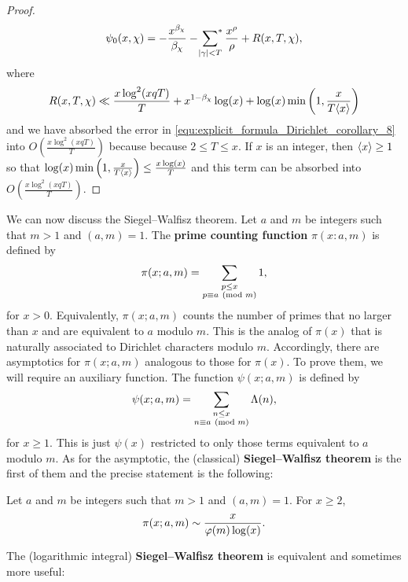 \begin{proof}
      \begin{equation}\label{equ:explicit_formula_Dirichlet_corollary_10}
        \psi_{0}(x,\chi) = -\frac{x^{\beta_{\chi}}}{\beta_{\chi}}-\sideset{}{^{\ast}}\sum_{|\gamma| < T}\frac{x^{\rho}}{\rho}+R(x,T,\chi),
      \end{equation}
      where
      \[
        R(x,T,\chi) \ll \frac{x\log^{2}(xqT)}{T}+x^{1-\beta_{\chi}}\log(x)+\log(x)\min\left(1,\frac{x}{T\langle x\rangle}\right)
      \]
      and we have absorbed the error in \cref{equ:explicit_formula_Dirichlet_corollary_8} into $O\left(\frac{x\log^{2}(xqT)}{T}\right)$ because because $2 \le T \le x$. If $x$ is an integer, then $\langle x\rangle \ge 1$ so that $\log(x)\min\left(1,\frac{x}{T\langle x\rangle}\right) \le \frac{x\log(x)}{T}$ and this term can be absorbed into $O\left(\frac{x\log^{2}(xqT)}{T}\right)$.
    \end{proof}
    
    We can now discuss the Siegel–Walfisz theorem. Let $a$ and $m$ be integers such that $m > 1$ and $(a,m) = 1$. The \textbf{prime counting function} $\pi(x:a,m)$ is defined by
    \[
      \pi(x;a,m) = \sum_{\substack{p \le x \\ p \equiv a \ \left(\text{mod }m\right)}}1,
    \]
    for $x > 0$. Equivalently, $\pi(x;a,m)$ counts the number of primes that no larger than $x$ and are equivalent to $a$ modulo $m$. This is the analog of $\pi(x)$ that is naturally associated to Dirichlet characters modulo $m$. Accordingly, there are asymptotics for $\pi(x;a,m)$ analogous to those for $\pi(x)$. To prove them, we will require an auxiliary function. The function $\psi(x;a,m)$ is defined by
    \[
      \psi(x;a,m) = \sum_{\substack{n \le x \\ n \equiv a \ \left(\text{mod }m\right)}}\Lambda(n),
    \]
    for $x \ge 1$. This is just $\psi(x)$ restricted to only those terms equivalent to $a$ modulo $m$. As for the asymptotic, the (classical) \textbf{Siegel–Walfisz theorem} is the first of them and the precise statement is the following:

    \begin{theorem}
      Let $a$ and $m$ be integers such that $m > 1$ and $(a,m) = 1$. For $x \ge 2$,
      \[
        \pi(x;a,m) \sim \frac{x}{\varphi(m)\log(x)}.
      \]
    \end{theorem}
    
    The (logarithmic integral) \textbf{Siegel–Walfisz theorem} is equivalent and sometimes more useful:

